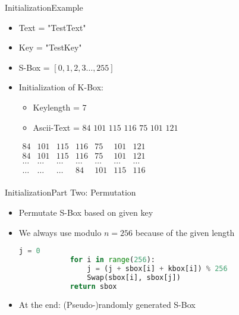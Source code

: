 \documentclass[
	aspectratio=169,	%
	onlytextwidth,		%
	t,					%
	]{beamer}
\begin{document}
\begin{frame}{Initialization}{Example}
	\begin{itemize}
		\item Text = "TestText"
		\item Key = "TestKey"
		\item S-Box = $[0, 1, 2, 3 \dots, 255]$
		\item Initialization of K-Box:
		\begin{itemize}
			\item Keylength = 7
			\item Ascii-Text = $84$ $101$ $115$ $116$ $75$ $101$ $121$
		\end{itemize}
		\medskip
		$\begin{array}{|ccccccc|}
		84 & 101 & 115 & 116 & 75 & 101 & 121 \\
		84 & 101 & 115 & 116 & 75 & 101 & 121 \\
		\dots & \dots & \dots & \dots & \dots & \dots & \dots \\
		\dots & \dots & \dots & 84 & 101 & 115 & 116 \\
		\end{array}$
	\end{itemize}
\end{frame}


\begin{frame}[fragile]{Initialization}{Part Two: Permutation}
	\begin{itemize}
		\item Permutate S-Box based on given key
		\item We always use modulo $n = 256$ because of the given length
		\begin{lstlisting}[language=Python]
			j = 0
			for i in range(256):
				j = (j + sbox[i] + kbox[i]) % 256
				Swap(sbox[i], sbox[j])
			return sbox
		\end{lstlisting}
		\item At the end: (Pseudo-)randomly generated S-Box
		
	\end{itemize}
\end{frame}
\end{document}
